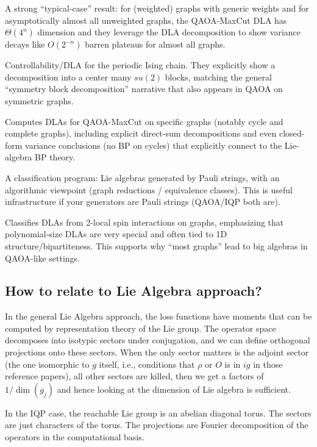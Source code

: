 \documentclass[a4paper,onecolumn,notitlepage,nofootinbib,longbibliography,superscriptaddress, floatfix, pra, aps, 10pt]{revtex4-2}
\begin{document}
\cite{mao2025qaoamaxcutbarrenplateausgraphs}
A strong “typical-case” result: for (weighted) graphs with generic weights and for asymptotically almost all unweighted graphs, the QAOA-MaxCut DLA has $\Theta(4^n)$ dimension and they leverage the DLA decomposition to show variance decays like $O(2^{-n})$ barren plateaus for almost all graphs.

\cite{dalessandro2024controllabilityperiodicquantumising} Controllability/DLA for the periodic Ising chain. They explicitly show a decomposition into a center many $su(2)$ blocks, matching the general “symmetry  block decomposition” narrative that also appears in QAOA on symmetric graphs.

\cite{allcock2024dynamicalliealgebrasquantum} Computes DLAs for QAOA-MaxCut on specific graphs (notably cycle and complete graphs), including explicit direct-sum decompositions and even closed-form variance conclusions (no BP on cycles) that explicitly connect to the Lie-algebra BP theory.

\cite{aguilar2024classificationpauliliealgebras} A classification program: Lie algebras generated by Pauli strings, with an algorithmic viewpoint (graph reductions / equivalence classes). This is useful infrastructure if your generators are Pauli strings (QAOA/IQP both are).

\cite{kökcü2024classificationdynamicalliealgebras} Classifies DLAs from 2-local spin interactions on graphs, emphasizing that polynomial-size DLAs are very special and often tied to 1D structure/bipartiteness. This supports why “most graphs” lead to big algebras in QAOA-like settings.

\subsection{How to relate to Lie Algebra approach?}
In the general Lie Algebra approach, the loss functions have moments that can be computed by representation theory of the Lie group. The operator space decomposes into isotypic sectors under conjugation, and we can define orthogonal projections onto these sectors. When the only sector matters is the adjoint sector (the one isomorphic to $g$ itself, i.e., conditions that $\rho$ or $O$ is in $ig$ in those reference papers), all other sectors are killed, then we get a factors of $1/\dim(g_j)$ and hence looking at the dimension of Lie algebra is sufficient.

In the IQP case, the reachable Lie group is an abelian diagonal torus. The sectors are just characters of the torus. The projections are Fourier decomposition of the operators in the computational basis. 
\end{document}
